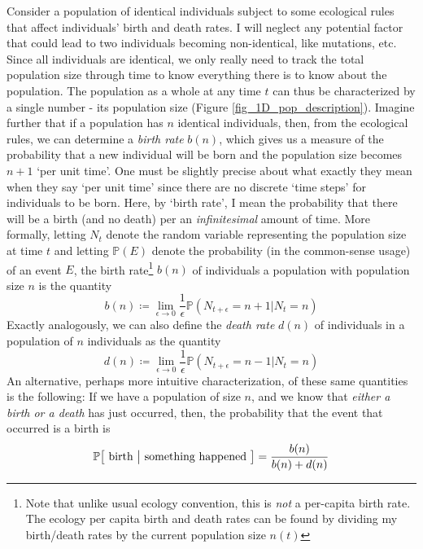 Consider a population of identical individuals subject to some ecological rules that affect individuals' birth and death rates. I will neglect any potential factor that could lead to two individuals becoming non-identical, like mutations, etc. Since all individuals are identical, we only really need to track the total population size through time to know everything there is to know about the population. The population as a whole at any time $t$ can thus be characterized by a single number - its population size (Figure \ref{fig_1D_pop_description}). Imagine further that if a population has $n$ identical individuals, then, from the ecological rules, we can determine a \emph{birth rate} $b(n)$, which gives us a measure of the probability that a new individual will be born and the population size becomes $n+1$ `per unit time'. One must be slightly precise about what exactly they mean when they say `per unit time' since there are no discrete `time steps' for individuals to be born. Here, by `birth rate', I mean the probability that there will be a birth (and no death) per an \emph{infinitesimal} amount of time. More formally, letting $N_t$ denote the random variable representing the population size at time $t$ and letting $\mathbb{P}(E)$ denote the probability (in the common-sense usage) of an event $E$, the birth rate\footnote{Note that unlike usual ecology convention, this is \emph{not} a per-capita birth rate. The ecology per capita birth and death rates can be found by dividing my birth/death rates by the current population size $n(t)$} $b(n)$ of individuals a population with population size $n$ is the quantity
\begin{equation}
\label{1D_birthrate_defn}
b(n) \coloneqq \lim_{\epsilon \to 0}\frac{1}{\epsilon}\mathbb{P}\left(N_{t+\epsilon}=n+1 | N_{t}=n\right)
\end{equation}
Exactly analogously, we can also define the \emph{death rate} $d(n)$ of individuals in a population of $n$ individuals as the quantity
\begin{equation}
\label{1D_deathrate_defn}
d(n) \coloneqq \lim_{\epsilon \to 0}\frac{1}{\epsilon}\mathbb{P}\left(N_{t+\epsilon}=n-1 | N_{t}=n\right)
\end{equation}
An alternative, perhaps more intuitive characterization, of these same quantities is the following: If we have a population of size $n$, and we know that \emph{either a birth or a death} has just occurred, then, the probability that the event that occurred is a birth is
\begin{equation*}
\mathbb{P\big[\textrm{ birth } \big{|} \textrm{ something happened }\big]} = \frac{b(n)}{b(n)+d(n)}
\end{equation*}
